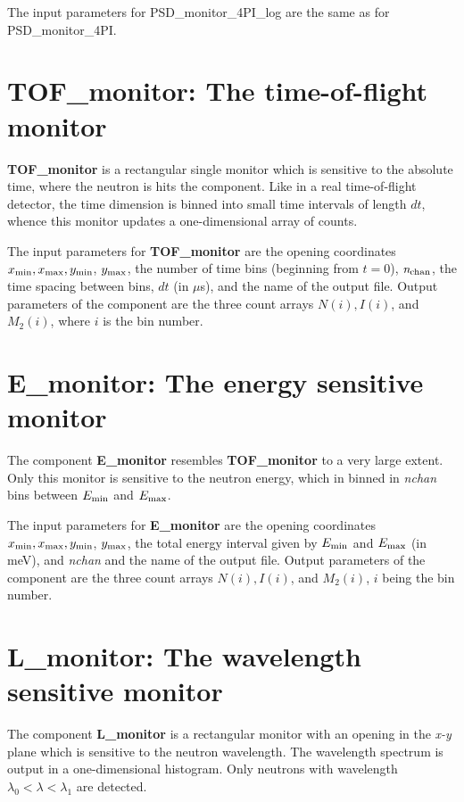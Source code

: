 The input parameters for PSD\_monitor\_4PI\_log are the same as for PSD\_monitor\_4PI.


\section{TOF\_monitor: The time-of-flight monitor}
{\bf TOF\_monitor} is a rectangular single monitor 
which is sensitive to
the absolute time, where the neutron is hits the component.
Like in a real time-of-flight detector, the time dimension is
binned into small time intervals of length $dt$, whence this monitor
updates a one-dimensional array of counts.

The input parameters for {\bf TOF\_monitor} are the opening 
coordinates $x_{\rm min}, x_{\rm max}, y_{\rm min}$, $y_{\rm max}$, 
the number of time bins (beginning from $t=0$),  
${\it n_{\rm chan}}$, the time spacing between bins, $dt$ (in $\mu$s), 
and the name of the output file. Output parameters of the component
are the three count arrays $N(i), I(i)$, and $M_2(i)$, where $i$ is
the bin number. 

\section{E\_monitor: The energy sensitive monitor}
\label{s:e_monitor}
The component {\bf E\_monitor} resembles {\bf TOF\_monitor}
to a very large extent. Only this monitor is sensitive to
the neutron energy, which in binned in \textit{nchan} bins between
$E_{\rm min}$ and $E_{\rm max}$.

The input parameters for {\bf E\_monitor} are the opening
coordinates $x_{\rm min}, x_{\rm max}, y_{\rm min}$, $y_{\rm max}$,
the total energy interval given by $E_{\rm min}$ and $E_{\rm max}$ (in meV), and
\textit{nchan} and the
name of the output file. Output parameters of the component
are the three count arrays
$N(i), I(i)$, and $M_2(i)$, $i$ being the bin number. 


\section{L\_monitor: The wavelength sensitive monitor}
\label{s:L_monitor}
The component {\bf L\_monitor} is a rectangular monitor with an opening
in the \textit{x-y} plane which is sensitive to the neutron wavelength.
The wavelength spectrum is output in a one-dimensional histogram.
Only neutrons with
wavelength $\lambda_0 < \lambda < \lambda_1$ are detected.

